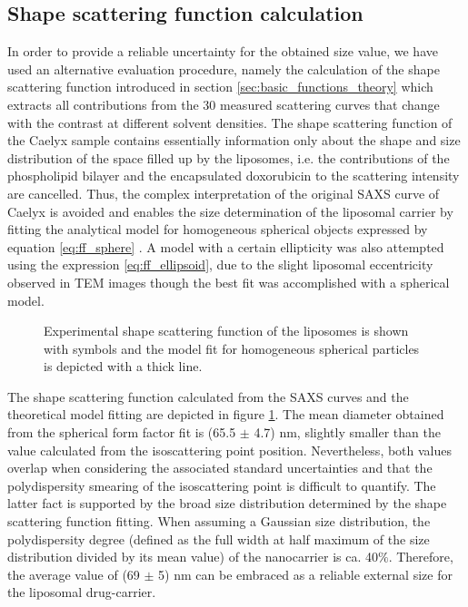 \subsection{Shape scattering function calculation}
In order to provide a reliable uncertainty for the obtained size value, we have used an alternative evaluation procedure, namely the calculation of the shape scattering function introduced in section \ref{sec:basic_functions_theory} which extracts all contributions from the 30 measured scattering curves that change with the contrast at different solvent densities. The shape scattering function of the Caelyx sample contains essentially information only about the shape and size distribution of the space filled up by the liposomes, i.e. the contributions of the phospholipid bilayer and the encapsulated doxorubicin to the scattering intensity are cancelled. Thus, the complex interpretation of the original SAXS curve of Caelyx is avoided and enables the size determination of the liposomal carrier by fitting the analytical model for homogeneous spherical objects expressed by equation \ref{eq:ff_sphere} . A model with a certain ellipticity was also attempted using the expression \ref{eq:ff_ellipsoid}, due to the slight liposomal eccentricity observed in TEM images \citep{barenholz_doxil_2012} though the best fit was accomplished with a spherical model. 

\begin{figure}
	\centering
		
		\caption[Experimental shape scattering function of Caelyx.]{Experimental shape scattering function of the liposomes is shown with symbols and the model fit for homogeneous spherical particles is depicted with a thick line.}
		\label{fig:CaelyxIodixanolResonantTerm}
\end{figure}

The shape scattering function calculated from the SAXS curves and the theoretical model fitting are depicted in figure \ref{fig:CaelyxIodixanolResonantTerm}. The mean diameter obtained from the spherical form factor fit is (65.5 $\pm$ 4.7) nm, slightly smaller than the value calculated from the isoscattering point position. Nevertheless, both values overlap when considering the associated standard uncertainties and that the polydispersity smearing of the isoscattering point is difficult to quantify. The latter fact is supported by the broad size distribution determined by the shape scattering function fitting. When assuming a Gaussian size distribution, the polydispersity degree (defined as the full width at half maximum of the size distribution divided by its mean value) of the nanocarrier is ca. 40$\%$. Therefore, the average value of (69 $\pm$ 5) nm can be embraced as a reliable external size for the liposomal drug-carrier.

